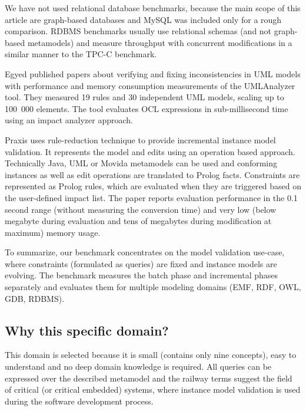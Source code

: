 We have not used relational database benchmarks, because the main scope of this
article are graph-based databases and MySQL was included only for a rough
comparison. RDBMS benchmarks usually use relational schemas (and not graph-based
metamodels) and measure throughput with concurrent modifications in a similar manner 
to the TPC-C \cite{tpc-c} benchmark.

Egyed published papers about verifying and fixing inconsistencies in UML models
\cite{Egyed-fixingInconsistencies, Egyed-instantConsistency} with performance
and memory consumption measurements \cite{Egyed-incConsistency} of the
UMLAnalyzer tool. They measured 19 rules and 30 independent UML models, scaling
up to 100\ 000 elements. The tool evaluates OCL expressions in sub-millisecond
time using an impact analyzer approach.

Praxis \cite{falleri-praxis} uses rule-reduction technique to provide incremental
instance model validation. It represents the model and edits using an operation
based approach. Technically Java, UML or Movida metamodels can be used and
conforming instances as well as edit operations are translated to Prolog facts.
Constraints are represented as Prolog rules, which are evaluated when they are
triggered based on the user-defined impact list. The paper reports evaluation
performance in the 0.1 second range (without measuring the conversion time) and
very low (below megabyte during evaluation and tens of megabytes during
modification at maximum) memory usage.

To summarize, our benchmark concentrates on the model validation use-case, where
constraints (formulated as queries) are fixed and instance models are evolving.
The benchmark measures the batch phase and incremental phases separately and
evaluates them for multiple modeling domains (EMF, RDF, OWL, GDB, RDBMS).


\subsection{Why this specific domain?}
This domain is selected because it is small (contains only nine concepts), easy
to understand and no deep domain knowledge is required. All queries can be
expressed over the described metamodel and the railway terms suggest the field
of critical (or critical embedded) systems, where instance model validation is
used during the software development process.

